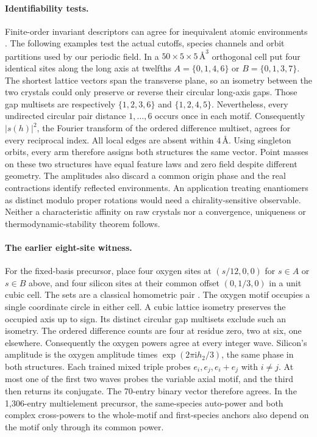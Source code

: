 \paragraph{Identifiability tests.}
Finite-order invariant descriptors can agree for inequivalent atomic environments
\cite{degenerate}. The following examples test the actual cutoffs, species channels
and orbit partitions used by our periodic field.
In a \(50\times5\times5\,\text{\AA}^3\) orthogonal cell put four identical sites along the long
axis at twelfths \(A=\{0,1,4,6\}\) or \(B=\{0,1,3,7\}\). The shortest lattice vectors span the
transverse plane, so an isometry between the two crystals could only preserve or reverse their
circular long-axis gaps. Those gap multisets are respectively \(\{1,2,3,6\}\) and
\(\{1,2,4,5\}\). Nevertheless, every undirected circular pair distance \(1,\ldots,6\) occurs once
in each motif. Consequently \(|s(h)|^2\), the Fourier transform of the ordered difference
multiset, agrees for every reciprocal index. All local edges are absent within \(4\,\text{\AA}\).
Using singleton orbits, every arm therefore assigns both structures the same vector.
Point masses on these two structures have equal feature laws and zero field despite different
geometry. The amplitudes also discard a common origin phase and the real contractions identify
reflected environments. An application treating enantiomers as distinct modulo proper
rotations would need a chirality-sensitive observable. Neither a characteristic affinity on raw crystals nor a convergence,
uniqueness or thermodynamic-stability theorem follows.

\paragraph{The earlier eight-site witness.}
For the fixed-basis precursor, place four oxygen sites at \((s/12,0,0)\) for
\(s\in A\) or \(s\in B\) above, and four silicon sites at their common offset
\((0,1/3,0)\) in a unit cubic cell. The sets are a classical homometric pair
\cite{zrelation,homometry}. The oxygen motif occupies a single coordinate circle
in either cell. A cubic lattice isometry preserves the occupied axis up to sign.
Its distinct circular gap multisets exclude such an isometry.
The ordered difference counts are four at residue zero, two at six, one elsewhere.
Consequently the oxygen powers agree at every integer wave. Silicon's amplitude is
the oxygen amplitude times \(\exp(2\pi\mathrm{i}h_2/3)\), the same phase in both
structures. Each trained mixed triple probes \(e_i,e_j,e_i+e_j\) with \(i\ne j\).
At most one of the first two waves probes the variable axial motif, and the third
then returns its conjugate. The 70-entry binary vector therefore agrees. In the
1,306-entry multielement precursor, the same-species auto-power and both complex
cross-powers to the whole-motif and first-species anchors also depend on the motif
only through its common power.

